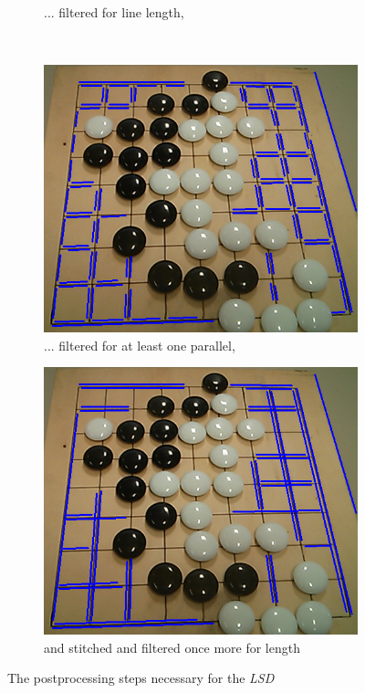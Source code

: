 \begin{figure}
\begin{center}
\begin{subfigure}{0.33\textwidth}
			\caption{... filtered for line length,}
			\label{fig:lsdPostprocessingLength}
		\end{subfigure}
		\\
		\begin{subfigure}{0.33\textwidth}
			\includegraphics[width=\textwidth]{images/lsd_parallel.png}
			\caption{... filtered for at least one parallel, }
			\label{fig:lsdPostprocessingParallel}
		\end{subfigure}
		\hspace{2em}
		\begin{subfigure}{0.33\textwidth}
			\includegraphics[width=\textwidth]{images/lsd_final.png}
			\caption{and stitched and filtered once more for length}
			\label{fig:lsdPostprocessingFinal}
		\end{subfigure}

		\caption{The postprocessing steps necessary for the \emph{LSD}}
	\end{center}
	\end{figure}


